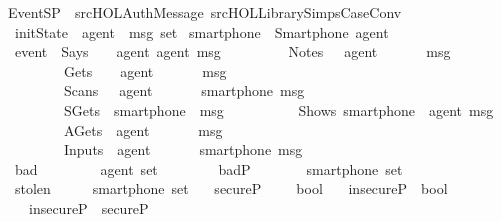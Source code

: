 %
\begin{isabellebody}%
  \isadelimtheory
  \isanewline
  \isanewline
  \endisadelimtheory
  \isatagtheory
  \isamarkupfalse%
  \ EventSP\ \ {\isachardoublequoteopen}{\isachartilde}{\isachartilde}{\isacharslash}src{\isacharslash}HOL{\isacharslash}Auth{\isacharslash}Message{\isachardoublequoteclose}\ {\isachardoublequoteopen}{\isachartilde}{\isachartilde}{\isacharslash}src{\isacharslash}HOL{\isacharslash}Library{\isacharslash}Simps{\isacharunderscore}Case{\isacharunderscore}Conv{\isachardoublequoteclose}\ %
  \endisatagtheory
  {\isafoldtheory}%
  \isadelimtheory
  \isanewline
  \endisadelimtheory
  \isanewline
  \isamarkupfalse%
  \ \isanewline
  \ \ initState\ {\isacharcolon}{\isacharcolon}\ {\isachardoublequoteopen}agent\ {\isacharequal}{\isachargreater}\ msg\ set{\isachardoublequoteclose}\isanewline
  \isanewline
  \isamarkupfalse%
  \ smartphone\ {\isacharequal}\ Smartphone\ agent\isanewline
  \isanewline
  \isamarkupfalse%
  \isanewline
  \ \ event\ {\isacharequal}\ Says\ \ \ \ agent\ agent\ msg\isanewline
  \ \ \ \ \ \ \ \ {\isacharbar}\ Notes\ \ \ agent\ \ \ \ \ \ \ msg\isanewline
  \ \ \ \ \ \ \ \ {\isacharbar}\ Gets\ \ \ \ agent\ \ \ \ \ \ \ msg\isanewline
  \ \ \ \ \ \ \ \ {\isacharbar}\ Scans\ \ \ agent\ \ \ \ \ \ \ smartphone\ msg\ \isanewline
  \ \ \ \ \ \ \ \ {\isacharbar}\ SGets\ \ smartphone\ \ msg\ \isanewline
  \ \ \ \ \ \ \ \ {\isacharbar}\ Shows\ smartphone\ \ agent\ msg\ \isanewline
  \ \ \ \ \ \ \ \ {\isacharbar}\ AGets\ \ agent\ \ \ \ \ \ \ msg\ \isanewline
  \ \ \ \ \ \ \ \ {\isacharbar}\ Inputs\ \ agent\ \ \ \ \ \ \ smartphone\ msg\ \isanewline
  \isanewline
  \isamarkupfalse%
  \isanewline
  \ \ bad\ \ \ \ \ \ \ \ {\isacharcolon}{\isacharcolon}\ {\isachardoublequoteopen}agent\ set{\isachardoublequoteclose}\ \ \ \ \ \ \isanewline
  \ \ badP\ \ \ \ \ \ \ {\isacharcolon}{\isacharcolon}\ {\isachardoublequoteopen}smartphone\ set{\isachardoublequoteclose}\ \isanewline
  \ \ stolen\ \ \ \ \ {\isacharcolon}{\isacharcolon}\ {\isachardoublequoteopen}smartphone\ set{\isachardoublequoteclose}\ \isanewline
  \ \ secureP\ \ \ \ {\isacharcolon}{\isacharcolon}\ {\isachardoublequoteopen}bool{\isachardoublequoteclose}\ \isanewline
  \isanewline
  \isamarkupfalse%
  \isanewline
  \ \ insecureP\ {\isacharcolon}{\isacharcolon}\ bool\ \ \isanewline
  \ \ \ \ {\isachardoublequoteopen}insecureP\ {\isacharequal}{\isacharequal}\ {\isasymnot}secureP{\isachardoublequoteclose}\isanewline

\end{isabellebody}
